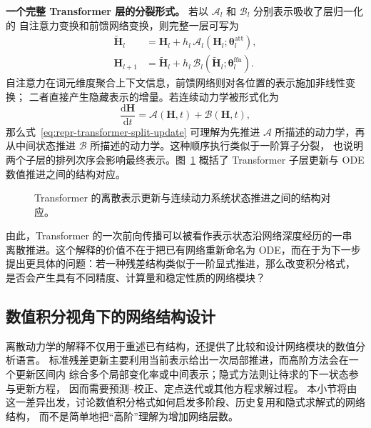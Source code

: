 \textbf{一个完整 Transformer 层的分裂形式。}
若以 \(\mathcal{A}_l\) 和 \(\mathcal{B}_l\) 分别表示吸收了层归一化的
自注意力变换和前馈网络变换，则完整一层可写为
\begin{align}
    \widetilde{\boldsymbol{H}}_l
    &=
    \boldsymbol{H}_l
    +
    h_l\,
    \mathcal{A}_l(
        \boldsymbol{H}_l;
        \boldsymbol{\theta}^{\mathrm{att}}_l
    ),
    \nonumber\\
    \boldsymbol{H}_{l+1}
    &=
    \widetilde{\boldsymbol{H}}_l
    +
    h_l\,
    \mathcal{B}_l(
        \widetilde{\boldsymbol{H}}_l;
        \boldsymbol{\theta}^{\mathrm{ffn}}_l
    ).
    \label{eq:repr-transformer-split-update}
\end{align}
自注意力在词元维度聚合上下文信息，前馈网络则对各位置的表示施加非线性变换；
二者直接产生隐藏表示的增量。若连续动力学被形式化为
\[
    \frac{\mathrm{d}\boldsymbol{H}}{\mathrm{d}t}
    =
    \mathcal{A}(\boldsymbol{H},t)
    +
    \mathcal{B}(\boldsymbol{H},t),
\]
那么式~\eqref{eq:repr-transformer-split-update} 可理解为先推进
\(\mathcal{A}\) 所描述的动力学，再从中间状态推进
\(\mathcal{B}\) 所描述的动力学。这种顺序执行类似于一阶算子分裂，
也说明两个子层的排列次序会影响最终表示。图~\ref{fig:transformer-sublayer-as-ode-solver}
概括了 Transformer 子层更新与 ODE 数值推进之间的结构对应。

\begin{figure}[htbp]
    \centering
    \caption{Transformer 的离散表示更新与连续动力系统状态推进之间的结构对应。}
    \label{fig:transformer-sublayer-as-ode-solver}
\end{figure}

由此，Transformer 的一次前向传播可以被看作表示状态沿网络深度经历的一串
离散推进。这个解释的价值不在于把已有网络重新命名为 ODE，而在于为下一步
提出更具体的问题：若一种残差结构类似于一阶显式推进，那么改变积分格式，
是否会产生具有不同精度、计算量和稳定性质的网络模块？

\subsection{数值积分视角下的网络结构设计}

离散动力学的解释不仅用于重述已有结构，还提供了比较和设计网络模块的数值分析语言。
标准残差更新主要利用当前表示给出一次局部推进，而高阶方法会在一个更新区间内
综合多个局部变化率或中间表示；隐式方法则让待求的下一状态参与更新方程，
因而需要预测--校正、定点迭代或其他方程求解过程。
本小节将由这一差异出发，讨论数值积分格式如何启发多阶段、历史复用和隐式求解式的网络结构，
而不是简单地把“高阶”理解为增加网络层数。

